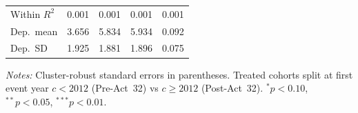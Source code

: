 \begin{table}[!htbp]
{\begin{tabular}{lcccc}
    \quad Within $R^2$ & 0.001 & 0.001 & 0.001 & 0.001 \\
    \quad Dep.\ mean & 3.656 & 5.834 & 5.934 & 0.092 \\
    \quad Dep.\ SD & 1.925 & 1.881 & 1.896 & 0.075 \\
    \bottomrule
  \end{tabular}
  }
  \vspace{0.3em}
  \begin{minipage}{0.95\textwidth}
    \footnotesize \textit{Notes:} Cluster-robust standard errors in parentheses. Treated cohorts split at first event year $c < 2012$ (Pre-Act~32) vs $c \geq 2012$ (Post-Act~32). $^{*}p<0.10$, $^{**}p<0.05$, $^{***}p<0.01$.
  \end{minipage}
\end{table}
